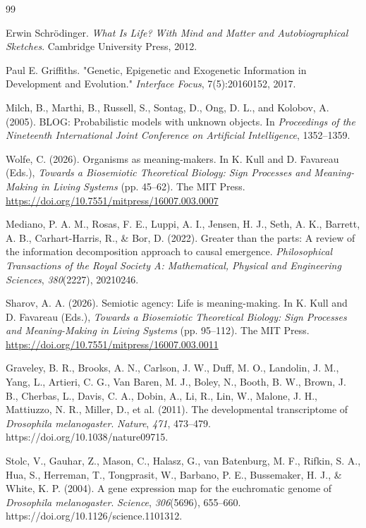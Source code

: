 \documentclass[pdflatex,sn-mathphys-num]{sn-jnl}
\theoremstyle{thmstylethree}
\theoremstyle{thmstyleone}
\begin{document}
\begin{thebibliography}{99}

Erwin Schr\"odinger.
\textit{What Is Life? With Mind and Matter and Autobiographical Sketches}.
Cambridge University Press, 2012.

Paul E. Griffiths.
"Genetic, Epigenetic and Exogenetic Information in Development and Evolution."
\textit{Interface Focus}, 7(5):20160152, 2017.


Milch, B., Marthi, B., Russell, S., Sontag, D., Ong, D. L., and Kolobov, A. (2005).
BLOG: Probabilistic models with unknown objects.
In \textit{Proceedings of the Nineteenth International Joint Conference on Artificial Intelligence}, 1352--1359.


Wolfe, C. (2026).
Organisms as meaning-makers.
In K. Kull and D. Favareau (Eds.),
\textit{Towards a Biosemiotic Theoretical Biology: Sign Processes and Meaning-Making in Living Systems}
(pp. 45--62).
The MIT Press.
\url{https://doi.org/10.7551/mitpress/16007.003.0007}

Mediano, P. A. M., Rosas, F. E., Luppi, A. I., Jensen, H. J., Seth, A. K., Barrett, A. B., Carhart-Harris, R., \& Bor, D. (2022).
Greater than the parts: A review of the information decomposition approach to causal emergence.
\textit{Philosophical Transactions of the Royal Society A: Mathematical, Physical and Engineering Sciences}, \textit{380}(2227), 20210246.

Sharov, A. A. (2026).
Semiotic agency: Life is meaning-making.
In K. Kull and D. Favareau (Eds.),
\textit{Towards a Biosemiotic Theoretical Biology: Sign Processes and Meaning-Making in Living Systems}
(pp. 95--112).
The MIT Press.
\url{https://doi.org/10.7551/mitpress/16007.003.0011}

Graveley, B. R., Brooks, A. N., Carlson, J. W., Duff, M. O., Landolin, J. M.,
Yang, L., Artieri, C. G., Van Baren, M. J., Boley, N., Booth, B. W.,
Brown, J. B., Cherbas, L., Davis, C. A., Dobin, A., Li, R., Lin, W.,
Malone, J. H., Mattiuzzo, N. R., Miller, D., et al. (2011).
The developmental transcriptome of \textit{Drosophila melanogaster}.
\textit{Nature}, \textit{471}, 473--479.
https://doi.org/10.1038/nature09715.

Stolc, V., Gauhar, Z., Mason, C., Halasz, G., van Batenburg, M. F., Rifkin, S. A., Hua, S., Herreman, T., Tongprasit, W., Barbano, P. E., Bussemaker, H. J., \& White, K. P. (2004).
A gene expression map for the euchromatic genome of \textit{Drosophila melanogaster}.
\textit{Science}, \textit{306}(5696), 655--660.
https://doi.org/10.1126/science.1101312.


\end{thebibliography}
\end{document}
